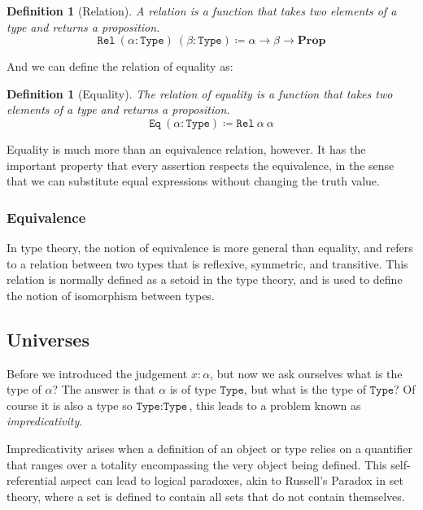 \documentclass[
  a4paper, 
  10pt, 
  parskip=half, 
  DIV=20,
  toc=bibliography,
  usegeometry,
]{scrartcl}
\newtheorem{definition}[theorem]{Definition}
\newcommand{\Prop}{\mathbf{Prop}}
\begin{document}
\begin{definition}[Relation]
  A relation is a function that takes two elements of a type and returns a
  proposition.
  \[
  \texttt{Rel} \ (\alpha : \texttt{Type}) \ (\beta : \texttt{Type}) 
    \coloneqq \alpha \to \beta \to \Prop 
  \]
\end{definition}

And we can define the relation of equality as:

\begin{definition}[Equality]
  The relation of equality is a function that takes two elements of a type and
  returns a proposition.
  \[
  \texttt{Eq} \ (\alpha: \texttt{Type}) \coloneqq \texttt{Rel} \ \alpha \ \alpha  
  \]
\end{definition}

Equality is much more than an equivalence relation, however. It has the important 
property that every assertion respects the equivalence, in the sense that we can 
substitute equal expressions without changing the truth value. 

\subsubsection{Equivalence}

In type theory, the notion of equivalence is more general than equality, and
refers to a relation between two types that is reflexive, symmetric, and
transitive. This relation is normally defined as a setoid in the type theory,
and is used to define the notion of isomorphism between types.

\subsection{Universes}

Before we introduced the judgement \(x: \alpha\), but now we ask ourselves 
what is the type of \(\alpha\)? The answer is that \(\alpha\) is of type
\(\texttt{Type}\), but what is the type of \(\texttt{Type}\)? Of course it is
also a type so \(\texttt{Type}: \texttt{Type}\), this leads to a problem known as
\emph{impredicativity}.

Impredicativity arises when a definition of an object or type relies on
a quantifier that ranges over a totality encompassing the very object being
defined. This self-referential aspect can lead to logical paradoxes, akin to
Russell's Paradox in set theory, where a set is defined to contain all sets that
do not contain themselves.
\end{document}
